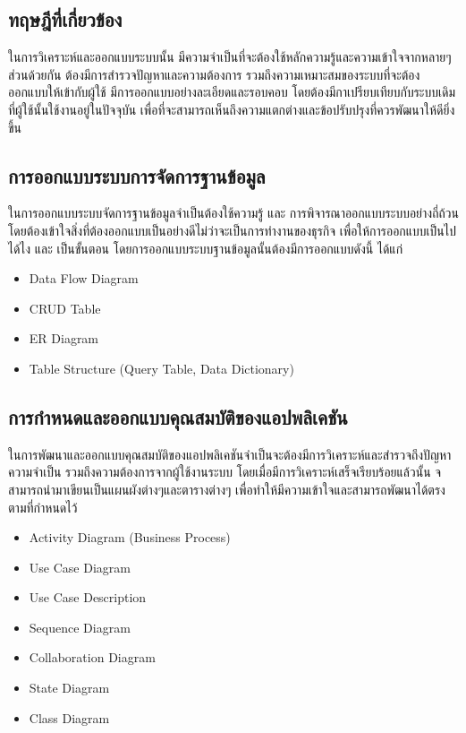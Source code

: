 \subsection{ทฤษฎีที่เกี่ยวข้อง}

ในการวิเคราะห์และออกแบบระบบนั้น มีความจำเป็นที่จะต้องใช้หลักความรู้และความเข้าใจจากหลายๆส่วนด้วยกัน ต้องมีการสำรวจปัญหาและความต้องการ รวมถึงความเหมาะสมของระบบที่จะต้องออกแบบให้เข้ากับผู้ใช้ มีการออกแบบอย่างละเอียดและรอบคอบ โดยต้องมีกาเปรียบเทียบกับระบบเดิมที่ผู้ใช้นั้นใช้งานอยู่ในปัจจุบัน เพื่อที่จะสามารถเห็นถึงความแตกต่างและข้อปรับปรุงที่ควรพัฒนาให้ดียิ่งขึ้น

\subsection{การออกแบบระบบการจัดการฐานข้อมูล}

ในการออกแบบระบบจัดการฐานข้อมูลจำเป็นต้องใช้ความรู้ และ การพิจารณาออกแบบระบบอย่างถี่ถ้วน โดยต้องเข้าใจสิ่งที่ต้องออกแบบเป็นอย่างดีไม่ว่าจะเป็นการทำงานของธุรกิจ เพื่อให้การออกแบบเป็นไปได้ไง และ เป็นขั้นตอน โดยการออกแบบระบบฐานข้อมูลนั้นต้องมีการออกแบบดังนี้ ได้แก่

\begin{itemize}
    \item Data Flow Diagram
    \item CRUD Table
    \item ER Diagram
    \item Table Structure (Query Table, Data Dictionary)
\end{itemize}

\subsection{การกำหนดและออกแบบคุณสมบัติของแอปพลิเคชัน}

ในการพัฒนาและออกแบบคุณสมบัติของแอปพลิเคชันจำเป็นจะต้องมีการวิเคราะห์และสำรวจถึงปัญหา ความจำเป็น รวมถึงความต้องการจากผู้ใช้งานระบบ โดยเมื่อมีการวิเคราะห์เสร็จเรียบร้อยแล้วนั้น จสามารถนำมาเขียนเป็นแผนผังต่างๆและตารางต่างๆ เพื่อทำให้มีความเข้าใจและสามารถพัฒนาได้ตรงตามที่กำหนดไว้

\begin{itemize}
    \item Activity Diagram (Business Process)
    \item Use Case Diagram
    \item Use Case Description
    \item Sequence Diagram
    \item Collaboration Diagram
    \item State Diagram
    \item Class Diagram
\end{itemize}

